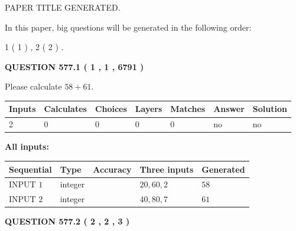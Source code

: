 \documentclass[12pt]{article}
\begin{document}
 
   
   
 PAPER TITLE GENERATED.
   
   
   
\vspace{0.2in}
   
In this paper, big questions will be generated in the following order: 
   
   
   1 ( 1 )
 ,
   2 ( 2 )
 .
  
\vspace{0.2in}
  
{\textbf{\Large{QUESTION
577.1 
 ( 1 , 1 , 6791 )
}}}
  
  
 
Please calculate $ %
58 +  %
61 $.
 
 
   
   
   
   
\noindent\begin{tabular}{|l|l|l|l|l|l|l|}
 \hline
Inputs & Calculates & Choices & Layers & Matches & Answer & Solution \\ \hline
 2  & 
 0  & 
 0
  & 
 0  & 
 0  & 
  no & 
  no 
  \\ \hline
 \end{tabular}
   
   
   
   
\noindent{}
   
   
   
   
\noindent\vspace{0.1in}\hspace{-0.08in} {\textbf{\Large{All inputs: }}}
   
   
  
  
\noindent\begin{tabular}{|l|l|l|l|l|}
\hline
 Sequential & Type & Accuracy & Three inputs & Generated \\ 
\hline
 
 
  INPUT $  1 $ & integer &  & $
 20
 , 
 60
 , 
 2
 $ & $ 58 $ 
 \\  \hline  
 
 
  INPUT $  2 $ & integer &  & $
 40
 , 
 80
 , 
 7
 $ & $ 61 $ 
 \\  \hline  
 \end{tabular}
   
   
  
\vspace{0.2in}
  
{\textbf{\Large{QUESTION
577.2 
 ( 2 , 2 , 3 )
}}}
  
\end{document}
